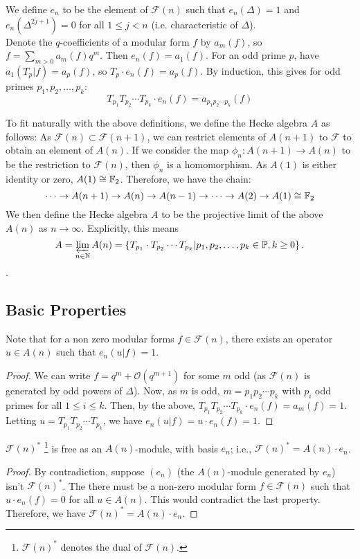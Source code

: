 We define $e_n$ to be the element of $\mathcal{F}(n)$ such that $e_n(\Delta) = 1$ and $e_n(\Delta^{2j+1}) = 0$ for all $1 \leq j <n$ (i.e. characteristic of $\Delta$).\\
Denote the $q$-coefficients of a modular form $f$ by $a_m(f)$, so $f = \sum_{m>0} a_m(f)q^m$.
Then $e_n(f) = a_1(f)$.
For an odd prime $p$, have $a_1(T_p|f) = a_p(f)$, so $T_p \cdot e_n(f) = a_p(f)$.
By induction, this gives for odd primes $p_1, p_2, \dots, p_k$:
$$
T_{p_1} T_{p_2} \cdots T_{p_k} \cdot e_n(f) 
= a_{p_1 p_2\cdots p_k}(f)
$$

To fit naturally with the above definitions, we define the Hecke algebra $A$ as follows:
As $\mathcal{F}(n) \subset \mathcal{F}(n+1)$, we can restrict elements of $A(n+1)$ to $\mathcal{F}$ to obtain an element of $A(n)$.
If we consider the map $\phi_n: A(n+1) \to A(n)$ to be the restriction to $\mathcal{F}(n)$, then $\phi_n$ is a homomorphism.
As $A(1)$ is either identity or zero, $A(1) \cong \mathbb{F}_2$.
Therefore, we have the chain:
$$
\dots \to A(n+1) \to A(n) \to A(n-1) \to \dots \to A(2) \to A(1) \cong \mathbb{F}_2
$$
We then define the Hecke algebra $A$ to be the projective limit of the above $A(n)$ as $n \to \infty$.
Explicitly, this means
$$
A = \varprojlim_{n \in \mathbb{N}} A(n) = \left\lbrace T_{p_1} \cdot T_{p_2} \cdots T_{p_k} | p_1, p_2, \dots, p_k \in \mathbb{P}, k\geq 0 \right\rbrace .
$$.



\subsection{Basic Properties}

\begin{property}
	Note that for a non zero modular forms $f \in \mathcal{F}(n)$, there exists an operator $u \in A(n)$ such that $e_n(u|f) = 1$.
\end{property}
\begin{proof}
	We can write $f = q^m + \mathcal{O}(q^{m+1})$ for some $m$ odd (as $\mathcal{F}(n)$ is generated by odd powers of $\Delta$).
	Now, as $m$ is odd, $m=p_1 p_2 \cdots p_k$ with $p_i$ odd primes for all $1 \leq i \leq k$.
	Then, by the above, $T_{p_1} T_{p_2} \cdots T_{p_k} \cdot e_n(f) = a_m(f) = 1$.
	Letting $u = T_{p_1} T_{p_2} \cdots T_{p_k}$, we have $e_n(u|f) = u \cdot e_n(f) = 1$.
\end{proof}

\begin{property}
	$\mathcal{F}(n)^*$ \footnote{$\mathcal{F}(n)^*$ denotes the dual of $\mathcal{F}(n)$.} is free as an $A(n)$-module, with basis $e_n$;	
	i.e., $\mathcal{F}(n)^* = A(n) \cdot e_n$.
\end{property}
\begin{proof}
	By contradiction, suppose $(e_n)$ (the $A(n)$-module generated by $e_n$) isn't $\mathcal{F}(n)^*$.
	The there must be a non-zero modular form $f \in \mathcal{F}(n)$ such that $u \cdot e_n(f)=0$ for all $u \in A(n)$.
	This would contradict the last property.
	Therefore, we have $\mathcal{F}(n)^* = A(n) \cdot e_n$.
\end{proof}


